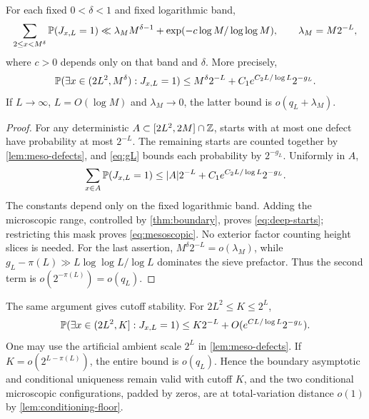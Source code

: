 \begin{proposition}\label{prop:deep-starts}
For each fixed $0<\delta<1$ and fixed logarithmic band,
\begin{equation}\label{eq:deep-starts}
 \sum_{2\le x<M^\delta}\mathbb P(J_{x,L}=1)
 \ll \lambda_M M^{\delta-1}+\exp(-c\log M/\log\log M),
 \qquad\lambda_M=M2^{-L},
\end{equation}
where $c>0$ depends only on that band and $\delta$.
More precisely,
\begin{equation}\label{eq:mesoscopic}
 \mathbb P(\exists x\in(2L^2,M^\delta):J_{x,L}=1)
 \le M^\delta2^{-L}+C_1 e^{C_2L/\log L}2^{-g_L}.
\end{equation}
If $L\to\infty$, $L=O(\log M)$ and $\lambda_M\to0$, the latter bound
is $o(q_L+\lambda_M)$.
\end{proposition}
\begin{proof}
For any deterministic $A\subset[2L^2,2M]\cap\mathbb Z$, starts with at most
one defect have probability at most $2^{-L}$. The remaining starts are
counted together by \cref{lem:meso-defects}, and \eqref{eq:gL} bounds each
probability by $2^{-g_L}$. Uniformly in $A$,
\[
 \sum_{x\in A}\mathbb P(J_{x,L}=1)
 \le |A|2^{-L}+C_1 e^{C_2L/\log L}2^{-g_L}.
\]
The constants depend only on the fixed logarithmic band. Adding the
microscopic range, controlled by \cref{thm:boundary}, proves
\eqref{eq:deep-starts}; restricting this mask proves \eqref{eq:mesoscopic}.
No exterior factor counting height slices is needed. For the last assertion,
$M^\delta2^{-L}=o(\lambda_M)$, while
$g_L-\pi(L)\gg L\log\log L/\log L$ dominates the sieve prefactor.
Thus the second term is $o(2^{-\pi(L)})=o(q_L)$.
\end{proof}

The same argument gives cutoff stability. For $2L^2\le K\le2^L$,
\begin{equation}\label{eq:cutoff-stability}
 \mathbb P(\exists x\in(2L^2,K]:J_{x,L}=1)
 \le K2^{-L}+O(e^{CL/\log L}2^{-g_L}).
\end{equation}
One may use the artificial ambient scale $2^L$ in
\cref{lem:meso-defects}. If $K=o(2^{L-\pi(L)})$, the entire bound is
$o(q_L)$. Hence the boundary asymptotic and conditional uniqueness remain
valid with cutoff $K$, and the two conditional microscopic configurations,
padded by zeros, are at total-variation distance $o(1)$ by
\cref{lem:conditioning-floor}.

